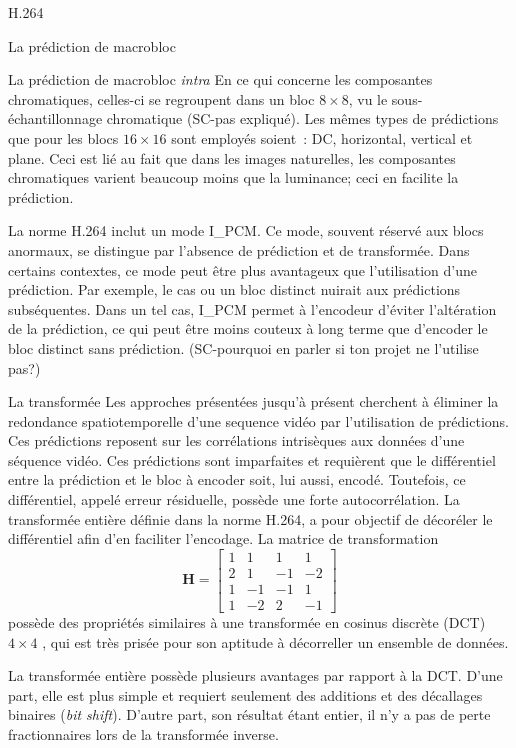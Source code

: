 \documentclass{article}
\begin{document}
\begin{section}{H.264}
\begin{subsection}{La prédiction de macrobloc}
\begin{subsubsection}{La prédiction de macrobloc \textit{intra}}
En ce qui concerne les composantes chromatiques, celles-ci se regroupent dans un
bloc $8 \times 8$, vu le sous-échantillonnage chromatique (SC-pas expliqué). Les mêmes types de
prédictions que pour les blocs $16 \times 16$ sont employés soient~: DC,
horizontal, vertical et plane. Ceci est lié au fait que dans les
images naturelles, les composantes chromatiques varient beaucoup moins que la
luminance; ceci en facilite la prédiction.

La norme H.264 inclut un mode I\_PCM. Ce mode, souvent réservé aux blocs
anormaux, se distingue par l'absence de prédiction et de transformée. Dans
certains contextes, ce mode peut être plus avantageux que l'utilisation d'une
prédiction. Par exemple, le cas ou un bloc distinct nuirait aux prédictions
subséquentes. Dans un tel cas, I\_PCM permet à l'encodeur d'éviter 
l'altération de la prédiction, ce qui peut être moins couteux à long terme que
d'encoder le bloc distinct sans prédiction. (SC-pourquoi en parler si ton projet ne l'utilise pas?)
\end{subsubsection}
\end{subsection}


\begin{subsection}{La transformée}
\newcommand{\ltH}{\mathbf{H}}
Les approches présentées jusqu'à présent cherchent à éliminer la redondance
spatiotemporelle d'une sequence vidéo par l'utilisation de prédictions. Ces
prédictions reposent sur les corrélations intrisèques aux données d'une séquence
vidéo. Ces prédictions sont imparfaites et requièrent que le différentiel entre la
prédiction et le bloc à encoder soit, lui aussi, encodé. Toutefois, ce
différentiel, appelé erreur résiduelle, possède une forte autocorrélation. La transformée entière
définie dans la norme H.264, a pour objectif de décoréler le différentiel afin
d'en faciliter l'encodage. La matrice de transformation
\begin{equation}
\ltH = \begin {bmatrix}
1 & 1 & 1 & 1\\
2 & 1 & -1 & -2\\
1 & -1 & -1 & 1\\
1 & -2 & 2 & -1
\end{bmatrix}
\end{equation}
possède des propriétés similaires à une transformée en cosinus discrète 
(DCT) $4 \times 4$ \cite{malvar2003}, qui est très prisée pour son aptitude
à décorreller un ensemble de données.

La transformée entière possède plusieurs avantages par rapport à la DCT.
D'une part, elle est plus simple et requiert seulement des additions et
des décallages binaires (\textit{bit shift}). D'autre part, son résultat étant
entier, il n'y a pas de perte fractionnaires lors de la transformée inverse.


\end{subsection}
\end{section}
\end{document}
